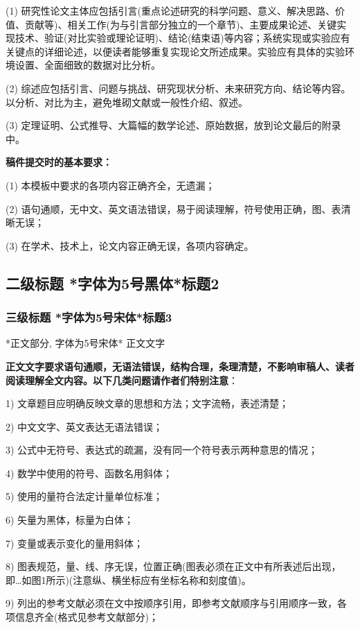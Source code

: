 \documentclass[10.5pt,compsoc]{CjC}
\theoremstyle{mystyle}
\begin{document}
\begin{CJK*}{GBK}{song}
(1) 研究性论文主体应包括引言(重点论述研究的科学问题、意义、解决思路、价值、贡献等)、相关工作(为与引言部分独立的一个章节)、主要成果论述、关键实现技术、验证(对比实验或理论证明)、结论(结束语)等内容；系统实现或实验应有关键点的详细论述，以便读者能够重复实现论文所述成果。实验应有具体的实验环境设置、全面细致的数据对比分析。

(2) 综述应包括引言、问题与挑战、研究现状分析、未来研究方向、结论等内容。以分析、对比为主，避免堆砌文献或一般性介绍、叙述。

(3) 定理证明、公式推导、大篇幅的数学论述、原始数据，放到论文最后的附录中。

{\bf 稿件提交时的基本要求：}

(1) 本模板中要求的各项内容正确齐全，无遗漏；

(2) 语句通顺，无中文、英文语法错误，易于阅读理解，符号使用正确，图、表清晰无误；

(3) 在学术、技术上，论文内容正确无误，各项内容确定。

{\begin{CJK*}{GBK}{hei}\subsection{二级标题 *字体为5号黑体*标题2}\end{CJK*}}
\subsubsection{三级标题 *字体为5号宋体*标题3}
*正文部分, 字体为5号宋体* 正文文字

\textbf{正文文字要求语句通顺，无语法错误，结构合理，条理清楚，不影响审稿人、读者阅读理解全文内容。以下几类问题请作者们特别注意}：

1) 文章题目应明确反映文章的思想和方法；文字流畅，表述清楚；

2) 中文文字、英文表达无语法错误；

3) 公式中无符号、表达式的疏漏，没有同一个符号表示两种意思的情况；

4) 数学中使用的符号、函数名用斜体；

5) 使用的量符合法定计量单位标准；

6) 矢量为黑体，标量为白体；

7) 变量或表示变化的量用斜体；

8) 图表规范，量、线、序无误，位置正确(图表必须在正文中有所表述后出现，即{\ldots}如图1所示)(注意纵、横坐标应有坐标名称和刻度值)。

9) 列出的参考文献必须在文中按顺序引用，即参考文献顺序与引用顺序一致，各项信息齐全(格式见参考文献部分)；


\end{CJK*}
\end{document}
